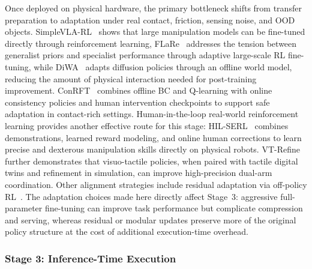\documentclass[acmsmall,screen,review]{acmart}
\begin{document}
Once deployed on physical hardware, the primary bottleneck shifts from transfer preparation to adaptation under real contact, friction, sensing noise, and OOD objects. 
SimpleVLA-RL~\cite{li2026simplevlarl} shows that large manipulation models can be fine-tuned directly through reinforcement learning, 
FLaRe~\cite{hu2024flare} addresses the tension between generalist priors and specialist performance through adaptive large-scale RL fine-tuning, 
while DiWA~\cite{chandra2025diwa} adapts diffusion policies through an offline world model, reducing the amount of physical interaction needed for post-training improvement. 
ConRFT~\cite{chen2025conrft} combines offline BC and Q-learning with online consistency policies and human intervention checkpoints to support safe adaptation in contact-rich settings. 
Human-in-the-loop real-world reinforcement learning provides another effective route for this stage: 
HIL-SERL~\cite{luo2025humaninloop} combines demonstrations, learned reward modeling, and online human corrections to learn precise and dexterous manipulation skills directly on physical robots.
VT-Refine~\cite{huang2025vtrefine} further demonstrates that visuo-tactile policies, when paired with tactile digital twins and refinement in simulation, can improve high-precision dual-arm coordination. Other alignment strategies include residual adaptation via off-policy RL~\cite{xiao2025pld}. 
The adaptation choices made here directly affect Stage~3: aggressive full-parameter fine-tuning can improve task performance but complicate compression and serving, whereas residual or modular updates preserve more of the original policy structure at the cost of additional execution-time overhead.

\subsubsection{Stage 3: Inference-Time Execution}\label{subsec:inference_execution}
\end{document}
